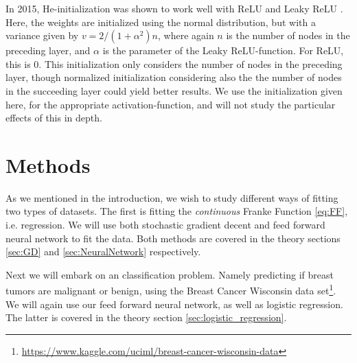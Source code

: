 \documentclass[12pt]{extarticle}
\begin{document}
In 2015, He-initialization was shown to work well with ReLU and Leaky ReLU \cite{He}. Here, the weights are initialized using the normal distribution, but with a variance given by $v = 2/(1 + \alpha^2)n$, where again $n$ is the number of nodes in the preceding layer, and $\alpha$ is the parameter of the Leaky ReLU-function. For ReLU, this is 0. This initialization only considers the number of nodes in the preceding layer, though normalized initialization considering also the the number of nodes in the succeeding layer could yield better results. We use the initialization given here, for the appropriate activation-function, and will not study the particular effects of this in depth.



\section{Methods}
As we mentioned in the introduction, we wish to study different ways of fitting two types of datasets. The first is fitting the \textit{continuous} Franke Function \eqref{eq:FF}, i.e. regression. We will use both stochastic gradient decent and feed forward neural network to fit the data. Both methods are covered in the theory sections \ref{sec:GD} and \ref{sec:NeuralNetwork} respectively.

Next we will embark on an classification problem. Namely predicting if breast tumors are malignant or benign, using the Breast Cancer Wisconsin data set\footnote{\href{https://www.kaggle.com/uciml/breast-cancer-wisconsin-data}{https://www.kaggle.com/uciml/breast-cancer-wisconsin-data}}. We will again use our feed forward neural network, as well as logistic regression. The latter is covered in the theory section \ref{sec:logistic_regression}.
\end{document}
